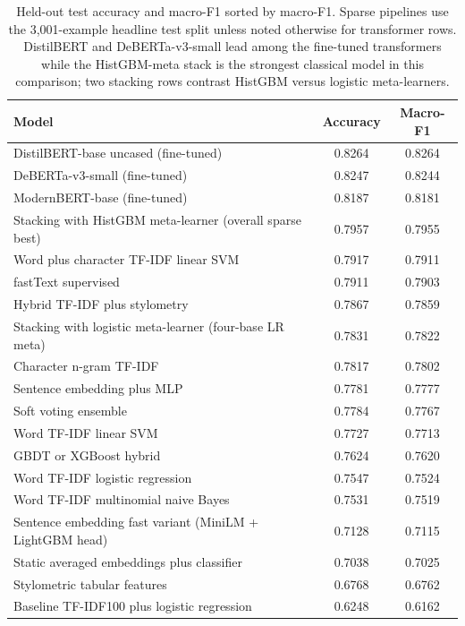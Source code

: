 \documentclass[10pt]{article}
\begin{document}
\begin{table}[h]
\centering
\footnotesize
\setlength{\tabcolsep}{4pt}
\begin{tabular}{lcc}
\hline
Model & Accuracy & Macro-F1 \\
\hline
DistilBERT-base uncased (fine-tuned) & 0.8264 & 0.8264 \\
DeBERTa-v3-small (fine-tuned) & 0.8247 & 0.8244 \\
ModernBERT-base (fine-tuned) & 0.8187 & 0.8181 \\
Stacking with HistGBM meta-learner (overall sparse best) & 0.7957 & 0.7955 \\
Word plus character TF-IDF linear SVM & 0.7917 & 0.7911 \\
fastText supervised & 0.7911 & 0.7903 \\
Hybrid TF-IDF plus stylometry & 0.7867 & 0.7859 \\
Stacking with logistic meta-learner (four-base LR meta) & 0.7831 & 0.7822 \\
Character n-gram TF-IDF & 0.7817 & 0.7802 \\
Sentence embedding plus MLP & 0.7781 & 0.7777 \\
Soft voting ensemble & 0.7784 & 0.7767 \\
Word TF-IDF linear SVM & 0.7727 & 0.7713 \\
GBDT or XGBoost hybrid & 0.7624 & 0.7620 \\
Word TF-IDF logistic regression & 0.7547 & 0.7524 \\
Word TF-IDF multinomial naive Bayes & 0.7531 & 0.7519 \\
Sentence embedding fast variant (MiniLM + LightGBM head) & 0.7128 & 0.7115 \\
Static averaged embeddings plus classifier & 0.7038 & 0.7025 \\
Stylometric tabular features & 0.6768 & 0.6762 \\
Baseline TF-IDF100 plus logistic regression & 0.6248 & 0.6162 \\
\hline
\end{tabular}
\caption{Held-out test accuracy and macro-F1 sorted by macro-F1. Sparse pipelines use the 3{,}001-example headline test split unless noted otherwise for transformer rows. DistilBERT and DeBERTa-v3-small lead among the fine-tuned transformers while the HistGBM-meta stack is the strongest classical model in this comparison; two stacking rows contrast HistGBM versus logistic meta-learners.}
\label{tab:results}
\end{table}
\end{document}
